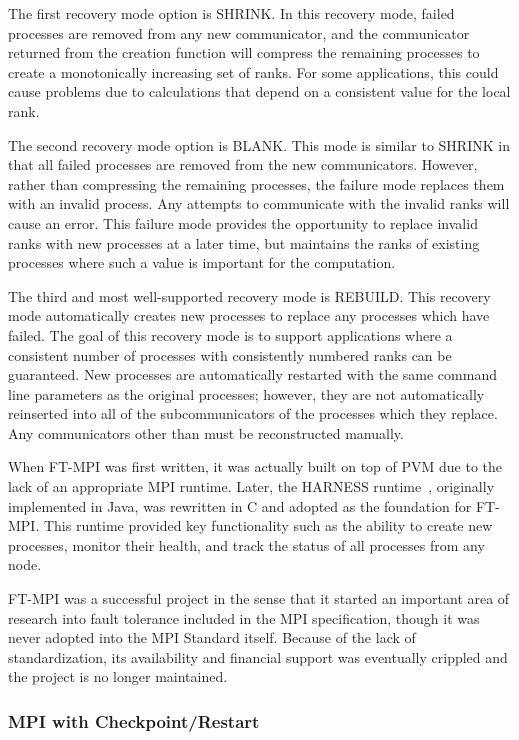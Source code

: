 The first recovery mode option is SHRINK. In this recovery mode, failed 
processes are removed from any new communicator, and the communicator returned 
from the creation function will compress the remaining processes to create a 
monotonically increasing set of ranks. For some applications, this could cause problems 
due to calculations that depend on a consistent value for the local rank.

The second recovery mode option is BLANK. This mode is similar to SHRINK in that 
all failed processes are removed from the new communicators. However, rather 
than compressing the remaining processes, the failure mode replaces them with an 
invalid process. Any attempts to communicate with the invalid ranks will cause 
an error. This failure mode provides the opportunity to replace invalid ranks 
with new processes at a later time, but maintains the ranks of existing processes 
where such a value is important for the computation.

The third and most well-supported recovery mode is REBUILD. This recovery mode 
automatically creates new processes to replace any processes which have failed. 
The goal of this recovery mode is to support applications where a consistent 
number of processes with consistently numbered ranks can be guaranteed. New processes 
are automatically restarted with the same command line parameters as the original 
processes; however, they are not automatically reinserted into all of the 
subcommunicators of the processes which they replace. Any communicators other than 
 must be reconstructed manually.

When FT-MPI was first written, it was actually built on top of PVM due to the 
lack of an appropriate MPI runtime. Later, the HARNESS 
runtime~\cite{Fagg:2001wk}, originally implemented in Java, was rewritten in C and adopted as the foundation for 
FT-MPI. This runtime provided key functionality such as the ability to create 
new processes, monitor their health, and track the status of all processes from 
any node.

FT-MPI was a successful project in the sense that it started an important area 
of research into fault tolerance included in the MPI specification, though it 
was never adopted into the MPI Standard itself. Because of the lack of 
standardization, its availability and financial support was eventually crippled 
and the project is no longer maintained.

\subsubsection{MPI with Checkpoint/Restart}

